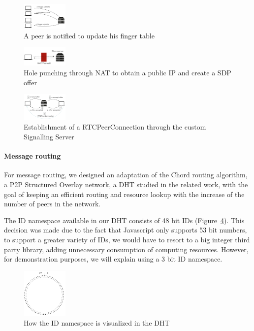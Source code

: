 \begin{figure}[h!]
  \centering
  \includegraphics[width=0.2\textwidth]{figs/2-peers-notified}
  \caption{A peer is notified to update his finger table}
  \label{fig:2-p-n}
\end{figure}

\begin{figure}[h!]
  \centering
  \includegraphics[width=0.2\textwidth]{figs/3-peer-stun}
  \caption{Hole punching through NAT to obtain a public IP and create a SDP offer}
  \label{fig:3-p-s}
\end{figure}

\begin{figure}[h!]
  \centering
  \includegraphics[width=0.2\textwidth]{figs/4-peer-connect}
  \caption{Establishment of a RTCPeerConnection through the custom Signalling Server}
  \label{fig:4-p-c}
\end{figure}

\paragraph{Message routing} For message routing, we designed an adaptation of the Chord routing algorithm, a P2P Structured Overlay network, a DHT studied in the related work, with the goal of keeping an efficient routing and resource lookup with the increase of the number of peers in the network.

The ID namespace available in our DHT consists of 48 bit IDs (Figure~\ref{fig:c-1}). This decision was made due to the fact that Javascript only supports 53 bit numbers, to support a greater variety of IDs, we would have to resort to a big integer third party library, adding unnecessary consumption of computing resources. However, for demonstration purposes, we will explain using a 3 bit ID namespace.

\begin{figure}[h!]
  \centering
  \includegraphics[width=0.2\textwidth]{figs/chord-1}
  \caption{How the ID namespace is visualized in the DHT}
  \label{fig:c-1}
\end{figure}

